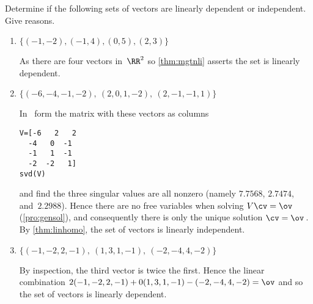 \begin{example} 
Determine if the following sets of vectors are linearly dependent or independent.  Give reasons.

\begin{enumerate}
\item \(\{(-1,-2), (-1,4), (0,5), (2,3)\}\)
\begin{solution} 
As there are four vectors in~\(\RR^2\) so \cref{thm:mgtnli} asserts the set is linearly dependent.
\end{solution}

\item \(\{(-6,-4,-1,-2),\ (2,0,1,-2),\ (2,-1,-1,1)\}\)
\begin{solution} 
In \script\ form the matrix with these vectors as columns
\begin{verbatim}
V=[-6   2   2
  -4   0  -1
  -1   1  -1
  -2  -2   1]
svd(V)
\end{verbatim}
\setbox\ajrqrbox\hbox{}%
\marginajrbox%
and find the three singular values are all nonzero (namely \(7.7568\), \(2.7474\), and~\(2.2988\)).
Hence there are no free variables when solving \(V\cv=\ov\) (\cref{pro:gensol}), and consequently there is only the unique solution \(\cv=\ov\)\,.
By \cref{thm:linhomo}, the set of vectors is linearly independent.
\end{solution}

\item \(\{(-1,-2,2,-1),\ (1,3,1,-1),\ (-2,-4,4,-2)\}\)
\begin{solution} 
By inspection, the third vector is twice the first.
Hence the linear combination \(2(-1,-2,2,-1)+0(1,3,1,-1)-(-2,-4,4,-2)=\ov\) and so the set of vectors is linearly dependent. 
\end{solution}

\end{enumerate}
\end{example}
